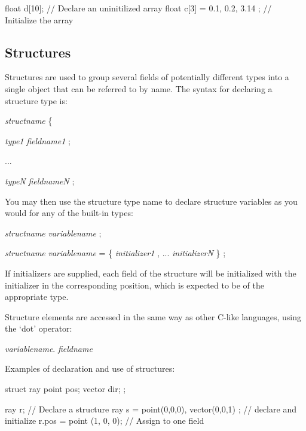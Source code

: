 \documentclass[11pt,letterpaper]{book}
\begin{document}
\begin{code}
    float d[10];                       // Declare an uninitilized array
    float c[3] = { 0.1, 0.2, 3.14 };   // Initialize the array
\end{code}

\subsection{Structures}

Structures are used to group several fields of potentially different
types into a single object that can be referred to by name.  The syntax
for declaring a structure type is:

\vspace{12pt}
 \emph{structname} {\cf \{} 

\spc\spc \emph{type1} \emph{fieldname1} {\cf ;}

\spc\spc ...

\spc\spc \emph{typeN} \emph{fieldnameN} {\cf ;}

\spc {\cf \} ;}
\vspace{12pt}

You may then use the structure type name to declare structure variables
as you would for any of the built-in types:

\vspace{12pt}
\spc \emph{structname} \emph{variablename} {\cf ;}

\spc \emph{structname} \emph{variablename} {\cf = \{ }
\emph{initializer1} {\cf ,} ... \emph{initializerN} {\cf \} ;}
\vspace{12pt}

If initializers are supplied, each field of the structure will be
initialized with the initializer in the corresponding position, which
is expected to be of the appropriate type.

Structure elements are accessed in the same way as other C-like
languages, using the `dot' operator: 

\vspace{12pt}
\spc \emph{variablename}{\cf .} \emph{fieldname}
\vspace{12pt}

Examples of declaration and use of structures:

\begin{code}
    struct ray {
        point pos;
        vector dir;
    };

    ray r;   // Declare a structure
    ray s = { point(0,0,0), vector(0,0,1) };  // declare and initialize
    r.pos = point (1, 0, 0);  // Assign to one field
\end{code}
\end{document}
